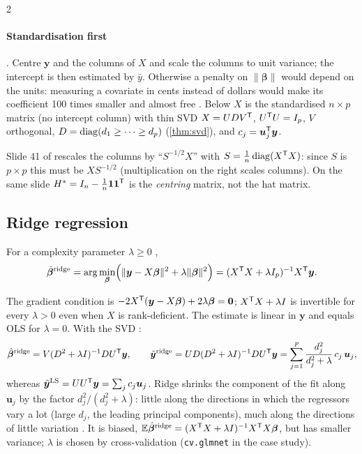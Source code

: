 \begin{paracol}{2}
\paragraph{Standardisation first} . Centre $\bm y$ and the columns of $X$ and scale the columns to unit
variance; the intercept is then estimated by $\bar y$. Otherwise a penalty on $\|\bm\beta\|$ would depend on the units:
measuring a covariate in cents instead of dollars would make its coefficient 100 times smaller and almost free
. Below $X$ is the standardised $n\times p$ matrix (no intercept column) with thin SVD
$X=UDV^{\mathsf T}$, $U^{\mathsf T} U=I_p$, $V$ orthogonal, $D=\operatorname{diag}(d_1\ge\dots\ge d_p)$ (\cref{thm:svd}), and $c_j=\bm u_j^{\mathsf T}\bm y$.

\begin{coursenote}
Slide 41 of  rescales the columns by ``$S^{-1/2}X$'' with $S=\frac1n\operatorname{diag}(X^{\mathsf T} X)$: since $S$ is $p\times p$ this must be
$XS^{-1/2}$ (multiplication on the right scales columns). On the same slide $H^*=I_n-\frac1n\bm 1\bm 1^{\mathsf T}$ is the
\emph{centring} matrix, not the hat matrix.
\end{coursenote}

\subsection{Ridge regression}
\begin{definition}[Ridge]
For a complexity parameter $\lambda\ge0$ ,
\[
  \hat{\bm\beta}^{\text{ridge}}=\arg\min_{\bm\beta}\Bigl(\|\bm y-X\bm\beta\|^2+\lambda\|\bm\beta\|^2\Bigr)=(X^{\mathsf T} X+\lambda I_p)^{-1}X^{\mathsf T}\bm y .
\]
\end{definition}
The gradient condition is $-2X^{\mathsf T}(\bm y-X\bm\beta)+2\lambda\bm\beta=\bm 0$; $X^{\mathsf T} X+\lambda I$ is invertible for every $\lambda>0$ even when $X$ is
rank-deficient. The estimate is linear in $\bm y$ and equals OLS for $\lambda=0$. With the SVD
:
\[
  \hat{\bm\beta}^{\text{ridge}}=V(D^2+\lambda I)^{-1}DU^{\mathsf T}\bm y,\qquad
  \hat{\bm y}^{\text{ridge}}=UD(D^2+\lambda I)^{-1}DU^{\mathsf T}\bm y=\sum_{j=1}^p\frac{d_j^2}{d_j^2+\lambda}\,c_j\,\bm u_j ,
\]
whereas $\hat{\bm y}^{\text{LS}}=UU^{\mathsf T}\bm y=\sum_jc_j\bm u_j$. Ridge shrinks the component of the fit along $\bm u_j$ by the factor
$d_j^2/(d_j^2+\lambda)$: little along the directions in which the regressors vary a lot (large $d_j$, the leading principal
components), much along the directions of little variation . It is biased,
$\mathbb{E}\hat{\bm\beta}^{\text{ridge}}=(X^{\mathsf T} X+\lambda I)^{-1}X^{\mathsf T} X\bm\beta$, but has smaller variance; $\lambda$ is chosen by cross-validation
(\texttt{cv.glmnet} in the case study).


\end{paracol}
